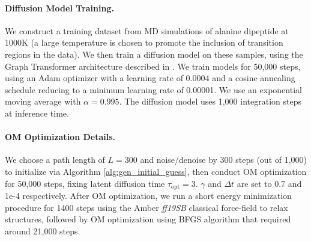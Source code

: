 
\paragraph{Diffusion Model Training.}
We construct a training dataset from MD simulations of alanine dipeptide at 1000K (a large temperature is chosen to promote the inclusion of transition regions in the data). We then train a diffusion model on these samples, using the Graph Transformer architecture described in . We train models for 50,000 steps, using an Adam optimizer with a learning rate of 0.0004 and a cosine annealing schedule reducing to a minimum learning rate of 0.00001. We use an exponential moving average with $\alpha = 0.995$. The diffusion model uses 1,000 integration steps at inference time.


\paragraph{OM Optimization Details.}
We choose a path length of $L=300$ and noise/denoise by 300 steps (out of 1,000) to initialize via Algorithm \ref{alg:gen_initial_guess}, then conduct OM optimization for 50,000 steps, fixing latent diffusion time $\tau_\text{opt}=3$. $\gamma$ and $\Delta t$ are set to 0.7 and 1e-4 respectively. After OM optimization, we run a short energy minimization procedure for 1400 steps using the Amber \textit{ff19SB} classical force-field to relax structures, followed by OM optimization using BFGS algorithm that required around 21,000 steps.

